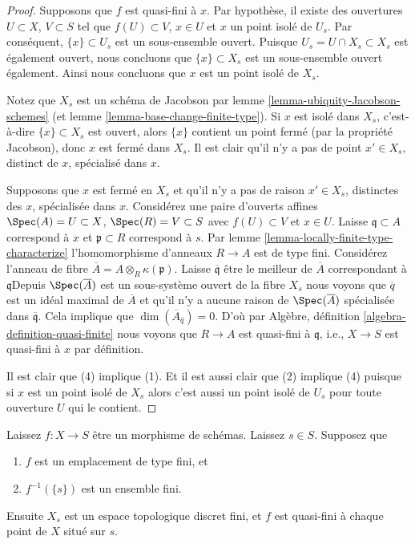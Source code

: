 \begin{proof}
Supposons que $f$ est quasi-fini à $x$. Par hypothèse, il existe des ouvertures $U \subset X$, $V \subset S$ tel que $f(U) \subset V$, $x \in U$ et $x$ un point isolé de $U_s$. Par conséquent, $\{x\} \subset U_s$ est un sous-ensemble ouvert. Puisque $U_s = U \cap X_s \subset X_s$ est également ouvert, nous concluons que $\{x\} \subset X_s$ est un sous-ensemble ouvert également. Ainsi nous concluons que $x$ est un point isolé de $X_s$.

\medskip\noindent
Notez que $X_s$ est un schéma de Jacobson par lemme \ref{lemma-ubiquity-Jacobson-schemes} (et lemme \ref{lemma-base-change-finite-type}). Si $x$ est isolé dans $X_s$, c'est-à-dire $\{x\} \subset X_s$ est ouvert, alors $\{x\}$ contient un point fermé (par la propriété Jacobson), donc $x$ est fermé dans $X_s$. Il est clair qu'il n'y a pas de point $x' \in X_s$, distinct de $x$, spécialisé dans $x$.

\medskip\noindent

Supposons que $x$ est fermé en $X_s$ et qu'il n'y a pas de raison $x' \in X_s$, distinctes des $x$, spécialisée dans $x$. Considérez une paire d'ouverts affines
$\Spec(A) = U \subset X$, $\Spec(R) = V \subset S$ avec
$f(U) \subset V$ et $x \in U$. Laisse $\mathfrak q \subset A$ correspond à
$x$ et $\mathfrak p \subset R$ correspond à $s$. Par lemme \ref{lemma-locally-finite-type-characterize} l'homomorphisme d'anneaux
$R \to A$ est de type fini. Considérez l'anneau de fibre
$\overline{A} = A \otimes_R \kappa(\mathfrak p)$. Laisse $\overline{\mathfrak q}$ être le meilleur de $\overline{A}$ correspondant à $\mathfrak q$Depuis $\Spec(\overline{A})$ est un sous-système ouvert de la fibre $X_s$ nous voyons que $\overline{q}$ est un idéal maximal de $\overline{A}$ et qu'il n'y a aucune raison de $\Spec(\overline{A})$
spécialisée dans $\overline{\mathfrak q}$. Cela implique que $\dim(\overline{A}_{\overline{q}}) = 0$. D'où par Algèbre, définition \ref{algebra-definition-quasi-finite}
nous voyons que $R \to A$ est quasi-fini à $\mathfrak q$, i.e.,
$X \to S$ est quasi-fini à $x$ par définition.

\medskip\noindent

Il est clair que (4) implique (1). Et il est aussi clair que (2) implique (4) puisque si $x$ est un point isolé de $X_s$
alors c'est aussi un point isolé de $U_s$ pour toute ouverture $U$
qui le contient.

\end{proof}

\begin{lemma}

\label{lemma-finite-fibre}
Laissez $f : X \to S$ être un morphisme de schémas. Laissez $s \in S$. Supposez que
\begin{enumerate}
\item $f$ est un emplacement de type fini, et
\item $f^{-1}(\{s\})$ est un ensemble fini.
\end{enumerate}
Ensuite $X_s$ est un espace topologique discret fini, et $f$ est quasi-fini à chaque point de $X$ situé sur $s$.
\end{lemma}

